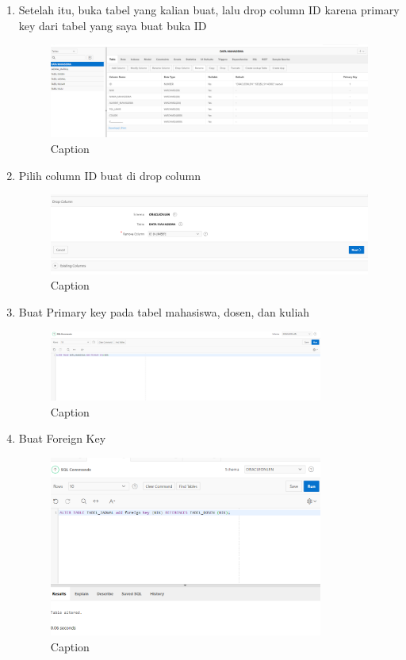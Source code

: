 \documentclass{article}
\begin{document}
\begin{enumerate}
    \item Setelah itu, buka tabel yang kalian buat, lalu drop column ID karena primary key dari tabel yang saya buat buka ID
     \begin{figure}[!htbp]
        \centering
        \includegraphics [width=14cm]{figure/Capture16.PNG}
        \caption{Caption}
        \label{fig:my_label}
    \end{figure}
    
    \item Pilih column ID buat di drop column
     \begin{figure}[!htbp]
        \centering
        \includegraphics [width=14cm]{figure/Capture17.PNG}
        \caption{Caption}
        \label{fig:my_label}
    \end{figure}
    
    \item Buat Primary key pada tabel mahasiswa, dosen, dan kuliah
    \begin{figure}[!htbp]
        \centering
        \includegraphics [width=9cm]{figure/Capture19.PNG}
        \caption{Caption}
        \label{fig:my_label}
    \end{figure}
    
    \item Buat Foreign Key 
    \begin{figure}[!htbp]
        \centering
        \includegraphics [width=9cm]{figure/Capture20.PNG}
        \caption{Caption}
        \label{fig:my_label}
    \end{figure}
    

\end{enumerate}
\end{document}
